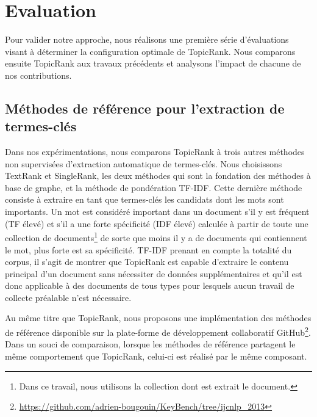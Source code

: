     \section{Evaluation}
    \label{sec:main-automatic_keyphrase_annotation-unsupervised_automatic_keyphrase_extraction-evaluation}
      Pour valider notre approche, nous réalisons une première série
      d'évaluations visant à déterminer la configuration optimale de TopicRank.
      Nous comparons  ensuite Topic\-Rank aux travaux précédents et analysons
      l'impact de chacune de nos contributions.
      
      \subsection{Méthodes de référence pour l'extraction de termes-clés}
      \label{subsec:main-automatic_keyphrase_annotation-unsupervised_automatic_keyphrase_extraction-evaluation-baselines}
        Dans nos expérimentations, nous comparons TopicRank à trois autres
        méthodes non supervisées d'extraction automatique de termes-clés. Nous
        choisissons TextRank et SingleRank, les deux méthodes qui sont la
        fondation des méthodes à base de graphe, et la méthode de pondération
        TF-IDF. Cette dernière méthode consiste à extraire en tant que
        termes-clés les candidats dont les mots sont importants. Un mot est
        considéré important dans un document s'il y est fréquent (TF élevé) et
        s'il a une forte spécificité (IDF élevé) calculée à partir de toute une
        collection de documents\footnote{Dans ce travail, nous utilisons la
        collection dont est extrait le document.} de sorte que moins il y a de
        documents qui contiennent le mot, plus forte est sa spécificité. TF-IDF
        prenant en compte la totalité du corpus, il s'agit de montrer que
        TopicRank est capable d'extraire le contenu principal d'un document sans
        nécessiter de données supplémentaires et qu'il est donc applicable à des
        documents de tous types pour lesquels aucun travail de collecte
        préalable n'est nécessaire.

        Au même titre que TopicRank, nous proposons une implémentation des
        méthodes de référence disponible sur la plate-forme de développement
        collaboratif
        GitHub\footnote{\url{https://github.com/adrien-bougouin/KeyBench/tree/ijcnlp_2013}}.
        Dans un souci de comparaison, lorsque les méthodes de référence
        partagent le même comportement que TopicRank, celui-ci est réalisé par
        le même composant.

